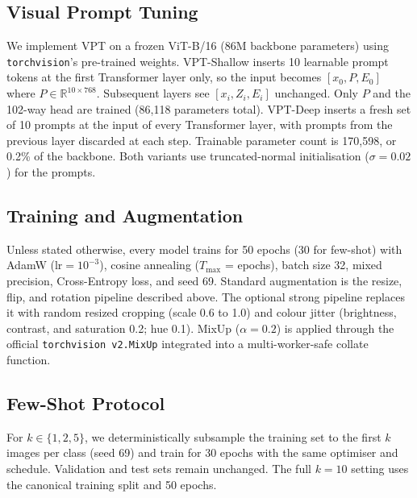 \subsection{Visual Prompt Tuning}

We implement VPT on a frozen ViT-B/16 (86M backbone parameters) using \texttt{torchvision}'s pre-trained weights. VPT-Shallow inserts 10 learnable prompt tokens at the first Transformer layer only, so the input becomes $[x_0, P, E_0]$ where $P \in \mathbb{R}^{10 \times 768}$. Subsequent layers see $[x_i, Z_i, E_i]$ unchanged. Only $P$ and the 102-way head are trained (86,118 parameters total). VPT-Deep inserts a fresh set of 10 prompts at the input of every Transformer layer, with prompts from the previous layer discarded at each step. Trainable parameter count is 170,598, or 0.2\% of the backbone. Both variants use truncated-normal initialisation ($\sigma = 0.02$) for the prompts.

\subsection{Training and Augmentation}

Unless stated otherwise, every model trains for 50 epochs (30 for few-shot) with AdamW ($\text{lr} = 10^{-3}$), cosine annealing ($T_{\max}$ = epochs), batch size 32, mixed precision, Cross-Entropy loss, and seed 69. Standard augmentation is the resize, flip, and rotation pipeline described above. The optional strong pipeline replaces it with random resized cropping (scale 0.6 to 1.0) and colour jitter (brightness, contrast, and saturation 0.2; hue 0.1). MixUp ($\alpha = 0.2$) is applied through the official \texttt{torchvision v2.MixUp} integrated into a multi-worker-safe collate function.

\subsection{Few-Shot Protocol}

For $k \in \{1, 2, 5\}$, we deterministically subsample the training set to the first $k$ images per class (seed 69) and train for 30 epochs with the same optimiser and schedule. Validation and test sets remain unchanged. The full $k = 10$ setting uses the canonical training split and 50 epochs.
